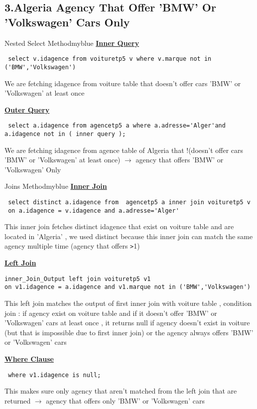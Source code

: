 \subsection*{3.Algeria Agency That Offer 'BMW' Or 'Volkswagen' Cars Only}


\begin{prettyBox}{Nested Select Method}{myblue}
\textbf{\underline{Inner Query}}

\begin{lstlisting}
 select v.idagence from voituretp5 v where v.marque not in ('BMW','Volkswagen')
\end{lstlisting}
We are fetching idagence from voiture table that doesn't offer cars 'BMW' or 'Volkswagen' at least once
\vspace{0.25cm}

\textbf{\underline{Outer Query}}
\begin{lstlisting}
 select a.idagence from agencetp5 a where a.adresse='Alger'and a.idagence not in ( inner query );
\end{lstlisting}
We are fetching idagence from agence table of Algeria that !(doesn't offer cars 'BMW' or 'Volkswagen' at least once) \(\rightarrow\) agency that offers 'BMW' or
'Volkswagen' Only

\end{prettyBox}

\newpage
\begin{prettyBox}{Joins Method}{myblue}
\textbf{\underline{Inner Join}}
\begin{lstlisting}
 select distinct a.idagence from  agencetp5 a inner join voituretp5 v 
 on a.idagence = v.idagence and a.adresse='Alger'
\end{lstlisting}
This inner join fetches distinct idagence that exist on voiture table and are located in 'Algeria'
, we used distinct because this inner join can match the same agency multiple time (agency that offers \texttt{>}1)

\vspace{0.25cm}
\textbf{\underline{Left Join}}
\begin{lstlisting}
inner_Join_Output left join voituretp5 v1 
on v1.idagence = a.idagence and v1.marque not in ('BMW','Volkswagen') 
\end{lstlisting}
This left join matches the output of first inner join with voiture table , condition join : if agency exist on voiture table
and if it doesn't offer 'BMW' or 'Volkswagen' cars at least once , it returns null if agency doesn't exist in voiture (but that is
impossible due to first inner join) or the agency always offers 'BMW' or 'Volkswagen' cars

\vspace{0.25cm}
\textbf{\underline{Where Clause}}
\begin{lstlisting}
 where v1.idagence is null;
\end{lstlisting}
This makes sure only agency that aren't matched from the left join that are returned \(\rightarrow\) agency that offers only 'BMW' or 'Volkswagen' cars 
\end{prettyBox}
